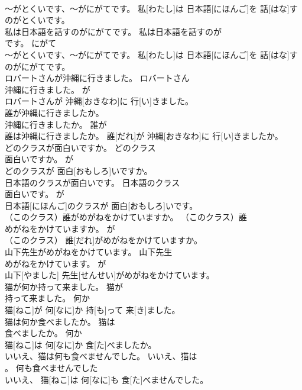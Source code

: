 \documentclass[8pt]{extreport}
\begin{document}
\begin{CJK}{UTF8}{min}
\\	～がとくいです、～がにがてです。	私[わたし]は 日本語[にほんご]を 話[はな]すのがとくいです。	
\\	私は日本語を話すのがにがてです。	私は日本語を話すのが
\\	です。	にがて	
\\	～がとくいです、～がにがてです。	私[わたし]は 日本語[にほんご]を 話[はな]すのがにがてです。	
\\	ロバートさんが沖縄に行きました。	ロバートさん
\\	沖縄に行きました。	が	
\\	ロバートさんが 沖縄[おきなわ]に 行[い]きました。	
\\	誰が沖縄に行きましたか。	
\\	沖縄に行きましたか。	誰が	
\\	誰は沖縄に行きましたか。	誰[だれ]が 沖縄[おきなわ]に 行[い]きましたか。	
\\	どのクラスが面白いですか。	どのクラス
\\	面白いですか。	が	
\\	どのクラスが 面白[おもしろ]いですか。	
\\	日本語のクラスが面白いです。	日本語のクラス
\\	面白いです。	が	
\\	日本語[にほんご]のクラスが 面白[おもしろ]いです。	
\\	（このクラス）誰がめがねをかけていますか。	（このクラス）誰
\\	めがねをかけていますか。	が	
\\	（このクラス） 誰[だれ]がめがねをかけていますか。	
\\	山下先生がめがねをかけています。	山下先生
\\	めがねをかけています。	が	
\\	山下[やました] 先生[せんせい]がめがねをかけています。	
\\	猫が何か持って来ました。	猫が
\\	持って来ました。	何か	
\\	猫[ねこ]が 何[なに]か 持[も]って 来[き]ました。	
\\	猫は何か食べましたか。	猫は
\\	食べましたか。	何か	
\\	猫[ねこ]は 何[なに]か 食[た]べましたか。	
\\	いいえ、猫は何も食べませんでした。	いいえ、猫は
\\	。	何も食べませんでした	
\\	いいえ、 猫[ねこ]は 何[なに]も 食[た]べませんでした。	
\end{CJK}
\end{document}
